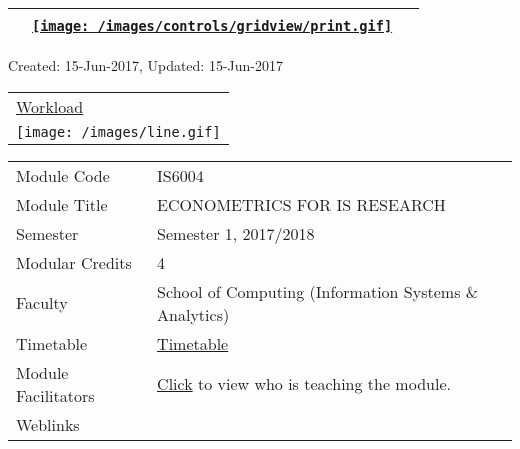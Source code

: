 \hypertarget{ctl00_ctl00_ContentPlaceHolder1_ContentPlaceHolder1_UP}{}
\hypertarget{contentstart}{}
\hypertarget{ctl00_ctl00_ContentPlaceHolder1_ContentPlaceHolder1_pnlMain}{}
\begin{longtable}[]{@{}ll@{}}
\toprule
&
{\href{javascript:PrintThisPage();}{\texttt{[image: /images/controls/gridview/print.gif]}}~~}\tabularnewline
\bottomrule
\end{longtable}

\protect\hypertarget{ctl00_ctl00_ContentPlaceHolder1_ContentPlaceHolder1_LV_UpdateInfo_ctrl0_txtDate}{}{Created:
15-Jun-2017, Updated: 15-Jun-2017}

\begin{longtable}[]{@{}l@{}}
\toprule
\protect\hypertarget{ctl00_ctl00_ContentPlaceHolder1_ContentPlaceHolder1_lblSectionTop}{}{\protect\hyperlink{Workload}{Workload}}\tabularnewline
\texttt{[image: /images/line.gif]}\tabularnewline
\bottomrule
\end{longtable}

\hypertarget{ctl00_ctl00_ContentPlaceHolder1_ContentPlaceHolder1_LV_itemPlaceholderContainer}{}
\begin{longtable}[]{@{}ll@{}}
\toprule
\protect\hypertarget{ctl00_ctl00_ContentPlaceHolder1_ContentPlaceHolder1_LV_ctrl0_txtCode}{}{Module
Code} &
\protect\hypertarget{ctl00_ctl00_ContentPlaceHolder1_ContentPlaceHolder1_LV_ctrl0_lcCode}{}{IS6004}\tabularnewline
\protect\hypertarget{ctl00_ctl00_ContentPlaceHolder1_ContentPlaceHolder1_LV_ctrl0_lcCourse}{}{Module
Title} &
\protect\hypertarget{ctl00_ctl00_ContentPlaceHolder1_ContentPlaceHolder1_LV_ctrl0_lcCourseName}{}{ECONOMETRICS
FOR IS RESEARCH}\tabularnewline
\protect\hypertarget{ctl00_ctl00_ContentPlaceHolder1_ContentPlaceHolder1_LV_ctrl0_lcSemester}{}{Semester}
&
\protect\hypertarget{ctl00_ctl00_ContentPlaceHolder1_ContentPlaceHolder1_LV_ctrl0_lcSem}{}{Semester
1, 2017/2018}\tabularnewline
\protect\hypertarget{ctl00_ctl00_ContentPlaceHolder1_ContentPlaceHolder1_LV_ctrl0_lcModCredit}{}{Modular
Credits} &
\protect\hypertarget{ctl00_ctl00_ContentPlaceHolder1_ContentPlaceHolder1_LV_ctrl0_lcModC}{}{4}\tabularnewline
\protect\hypertarget{ctl00_ctl00_ContentPlaceHolder1_ContentPlaceHolder1_LV_ctrl0_lcFaculty}{}{Faculty}
&
\protect\hypertarget{ctl00_ctl00_ContentPlaceHolder1_ContentPlaceHolder1_LV_ctrl0_lcFac}{}{School
of Computing (Information Systems \& Analytics)}\tabularnewline
\protect\hypertarget{ctl00_ctl00_ContentPlaceHolder1_ContentPlaceHolder1_LV_ctrl0_Label1}{}{Timetable}
&
\protect\hypertarget{ctl00_ctl00_ContentPlaceHolder1_ContentPlaceHolder1_LV_ctrl0_Span1}{}{\href{javascript:void(0);}{Timetable}}\tabularnewline
\protect\hypertarget{ctl00_ctl00_ContentPlaceHolder1_ContentPlaceHolder1_LV_ctrl0_Label6}{}{Module
Facilitators} &
\protect\hypertarget{ctl00_ctl00_ContentPlaceHolder1_ContentPlaceHolder1_LV_ctrl0_Span2}{}{\href{list_lecturers.aspx?CourseID=0029bcdf-8dd4-4f5e-a9db-b4f4d1936235\&ClickFrom=}{Click}
to view who is teaching the module.}\tabularnewline
\protect\hypertarget{ctl00_ctl00_ContentPlaceHolder1_ContentPlaceHolder1_LV_ctrl0_LabelCtrl1}{}{Weblinks}
&\tabularnewline
\bottomrule
\end{longtable}

